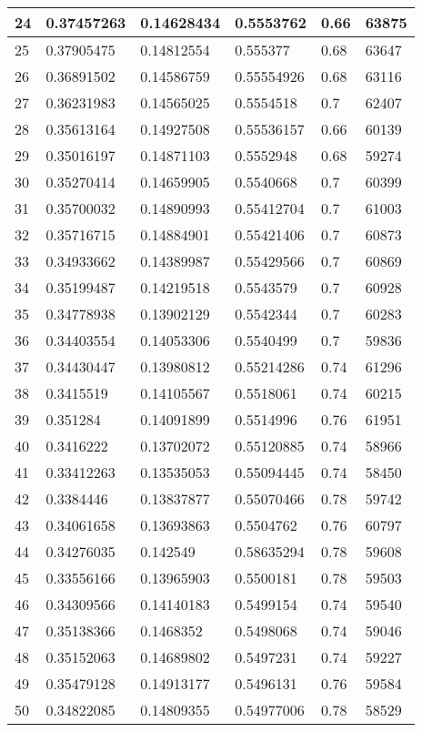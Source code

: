 \begin{longtable}{|l|l|l|l|l|l|}
24 & 0.37457263 & 0.14628434 & 0.5553762 & 0.66 & 63875 \\ \hline 
25 & 0.37905475 & 0.14812554 & 0.555377 & 0.68 & 63647 \\ \hline 
26 & 0.36891502 & 0.14586759 & 0.55554926 & 0.68 & 63116 \\ \hline 
27 & 0.36231983 & 0.14565025 & 0.5554518 & 0.7 & 62407 \\ \hline 
28 & 0.35613164 & 0.14927508 & 0.55536157 & 0.66 & 60139 \\ \hline 
29 & 0.35016197 & 0.14871103 & 0.5552948 & 0.68 & 59274 \\ \hline 
30 & 0.35270414 & 0.14659905 & 0.5540668 & 0.7 & 60399 \\ \hline 
31 & 0.35700032 & 0.14890993 & 0.55412704 & 0.7 & 61003 \\ \hline 
32 & 0.35716715 & 0.14884901 & 0.55421406 & 0.7 & 60873 \\ \hline 
33 & 0.34933662 & 0.14389987 & 0.55429566 & 0.7 & 60869 \\ \hline 
34 & 0.35199487 & 0.14219518 & 0.5543579 & 0.7 & 60928 \\ \hline 
35 & 0.34778938 & 0.13902129 & 0.5542344 & 0.7 & 60283 \\ \hline 
36 & 0.34403554 & 0.14053306 & 0.5540499 & 0.7 & 59836 \\ \hline 
37 & 0.34430447 & 0.13980812 & 0.55214286 & 0.74 & 61296 \\ \hline 
38 & 0.3415519 & 0.14105567 & 0.5518061 & 0.74 & 60215 \\ \hline 
39 & 0.351284 & 0.14091899 & 0.5514996 & 0.76 & 61951 \\ \hline 
40 & 0.3416222 & 0.13702072 & 0.55120885 & 0.74 & 58966 \\ \hline 
41 & 0.33412263 & 0.13535053 & 0.55094445 & 0.74 & 58450 \\ \hline 
42 & 0.3384446 & 0.13837877 & 0.55070466 & 0.78 & 59742 \\ \hline 
43 & 0.34061658 & 0.13693863 & 0.5504762 & 0.76 & 60797 \\ \hline 
44 & 0.34276035 & 0.142549 & 0.58635294 & 0.78 & 59608 \\ \hline 
45 & 0.33556166 & 0.13965903 & 0.5500181 & 0.78 & 59503 \\ \hline 
46 & 0.34309566 & 0.14140183 & 0.5499154 & 0.74 & 59540 \\ \hline 
47 & 0.35138366 & 0.1468352 & 0.5498068 & 0.74 & 59046 \\ \hline 
48 & 0.35152063 & 0.14689802 & 0.5497231 & 0.74 & 59227 \\ \hline 
49 & 0.35479128 & 0.14913177 & 0.5496131 & 0.76 & 59584 \\ \hline 
50 & 0.34822085 & 0.14809355 & 0.54977006 & 0.78 & 58529 \\ \hline 
\end{longtable}